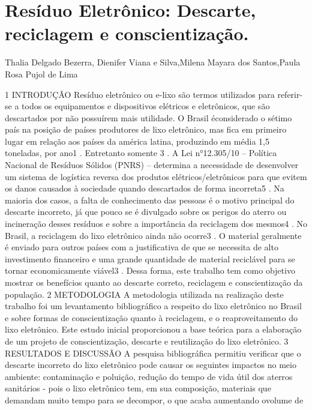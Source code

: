

\section{Resíduo Eletrônico: Descarte, reciclagem e conscientização.}

Thalia Delgado Bezerra, Dienifer Viana e Silva,Milena Mayara dos Santos,Paula Rosa Pujol de Lima

1 INTRODUÇÃO
Resíduo eletrônico ou e-lixo são termos utilizados para referir-se a todos os equipamentos
e dispositivos elétricos e eletrônicos, que são descartados por não possuírem mais utilidade. O
Brasil éconsiderado o sétimo país na posição de países produtores de lixo eletrônico, mas fica 
em primeiro lugar em relação aos países da américa latina, produzindo em média 1,5 toneladas, 
por ano1
. Entretanto somente 3%
.
A Lei n°12.305/10 – Política Nacional de Resíduos Sólidos (PNRS) – determina a
necessidade de desenvolver um sistema de logística reversa dos produtos elétricos/eletrônicos
para que evitem os danos causados à sociedade quando descartados de forma incorreta5
. Na
maioria dos casos, a falta de conhecimento das pessoas é o motivo principal do descarte incorreto,
já que pouco se é divulgado sobre os perigos do aterro ou incineração desses resíduos e sobre a
importância da reciclagem dos mesmos4
.
No Brasil, a reciclagem do lixo eletrônico ainda não ocorre3
. O material geralmente é
enviado para outros países com a justificativa de que se necessita de alto investimento financeiro
e uma grande quantidade de material reciclável para se tornar economicamente viável3
. Dessa
forma, este trabalho tem como objetivo mostrar os benefícios quanto ao descarte correto,
reciclagem e conscientização da população.
2 METODOLOGIA
A metodologia utilizada na realização deste trabalho foi um levantamento bibliográfico a
respeito do lixo eletrônico no Brasil e sobre formas de conscientização quanto à reciclagem, e o
reaproveitamento do lixo eletrônico. Este estudo inicial proporcionou a base teórica para a
elaboração de um projeto de conscientização, descarte e reutilização do lixo eletrônico.
3 RESULTADOS E DISCUSSÃO
A pesquisa bibliográfica permitiu verificar que o descarte incorreto do lixo eletrônico 
pode causar os seguintes impactos no meio ambiente: contaminação e poluição, redução do
tempo de vida útil dos aterros sanitários - pois o lixo eletrônico tem, em sua composição, 
materiais que demandam muito tempo para se decompor, o que acaba aumentando ovolume de
